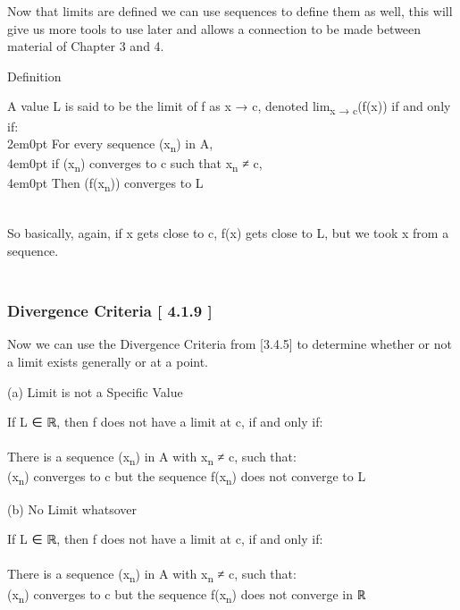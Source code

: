 Now that limits are defined we can use sequences to define them as well,
this will give us more tools to use later and allows a connection to be
made between material of Chapter 3 and 4.

Definition\protect\hypertarget{definition}{}{}

A value {L} is said to be the limit of {f} as {x} → {c}, denoted
lim\textsubscript{{x} → {c}}({f}({x})) if and only if:\\

2em0pt {For every} sequence ({x}\textsubscript{{n}}) in {A},\\

4em0pt {if} ({x}\textsubscript{{n}}) converges to {c} such that
{x}\textsubscript{{n}} ≠ {c},\\

4em0pt {Then} ({f}({x}\textsubscript{{n}})) converges to {L}

~\\
So basically, again, if {x} gets close to {c}, {f}({x}) gets close to L,
but we took {x} from a sequence.

\hypertarget{divergence-criteria-4.1.9}{%
\subsubsection[\hfill\break
Divergence Criteria {[} 4.1.9
{]}]{\texorpdfstring{\protect\hypertarget{SECTION00011400000000000000}{}{}\protect\hypertarget{divergence-criteria-4.1.9}{}{}~\\
Divergence Criteria {[} 4.1.9
{]}}{ Divergence Criteria {[} 4.1.9 {]}}}\label{divergence-criteria-4.1.9}}

Now we can use the {Divergence Criteria} from {[}3.4.5{]} to determine
whether or not a limit exists generally or at a point.

(a) Limit is not a Specific
Value\protect\hypertarget{a-limit-is-not-a-specific-value}{}{}

If {L} ∈ ℝ, then {f} does not have a limit at {c}, if and only if:\\
~\\
There is a sequence ({x}\textsubscript{{n}}) in {A} with
{x}\textsubscript{{n}} ≠ {c}, such that:\\
({x}\textsubscript{{n}}) converges to {c} but the sequence
{f}({x}\textsubscript{{n}}) does not converge to {L}

(b) No Limit whatsover\protect\hypertarget{b-no-limit-whatsover}{}{}

If {L} ∈ ℝ, then {f} does not have a limit at {c}, if and only if:\\
~\\
There is a sequence ({x}\textsubscript{{n}}) in {A} with
{x}\textsubscript{{n}} ≠ {c}, such that:\\
({x}\textsubscript{{n}}) converges to {c} but the sequence
{f}({x}\textsubscript{{n}}) does not converge in ℝ

